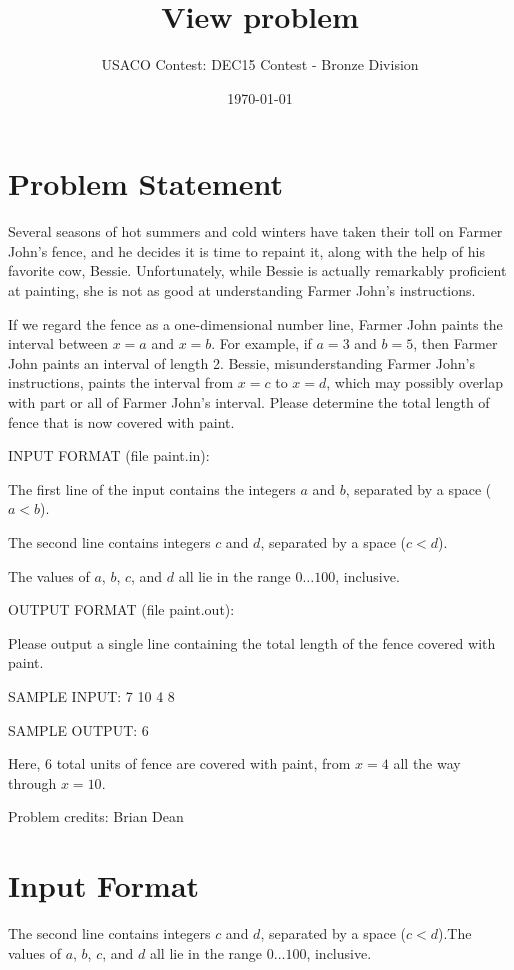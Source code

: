 \documentclass[12pt]{article}
\title{View problem}
\author{USACO Contest: DEC15 Contest - Bronze Division}
\date{\today}
\begin{document}
\maketitle

\section*{Problem Statement}

Several seasons of hot summers and cold winters have taken their toll on Farmer
John's fence, and he decides it is time to repaint it, along with the help of
his favorite cow, Bessie.  Unfortunately, while Bessie is actually remarkably
proficient at painting, she is not as good at understanding Farmer John's
instructions.

If we regard the fence as a one-dimensional number line, Farmer
John paints the interval between $x=a$ and $x=b$. For example, if
$a=3$ and $b=5$, then Farmer John paints an interval of length 2.
Bessie, misunderstanding Farmer John's instructions, paints the
interval from $x=c$ to $x=d$, which may possibly overlap with part or
all of Farmer John's interval.  Please determine the total length of
fence that is now covered with paint.  

INPUT FORMAT (file paint.in):

The first line of the input contains the integers $a$ and $b$, separated by a
space ($a < b$). 

The second line contains integers $c$ and $d$, separated by a space ($c < d$). 

The values of $a$, $b$, $c$, and $d$ all lie in the range $0 \ldots 100$, inclusive.


OUTPUT FORMAT (file paint.out):

Please output a single line containing the total length of the fence covered with paint.


SAMPLE INPUT:
7 10
4 8

SAMPLE OUTPUT: 
6

Here, 6 total units of fence are covered with paint, from $x=4$ all
the way through $x=10$.

Problem credits: Brian Dean



\section*{Input Format}
The second line contains integers $c$ and $d$, separated by a space ($c < d$).The values of $a$, $b$, $c$, and $d$ all lie in the range $0 \ldots 100$, inclusive.
\end{document}
